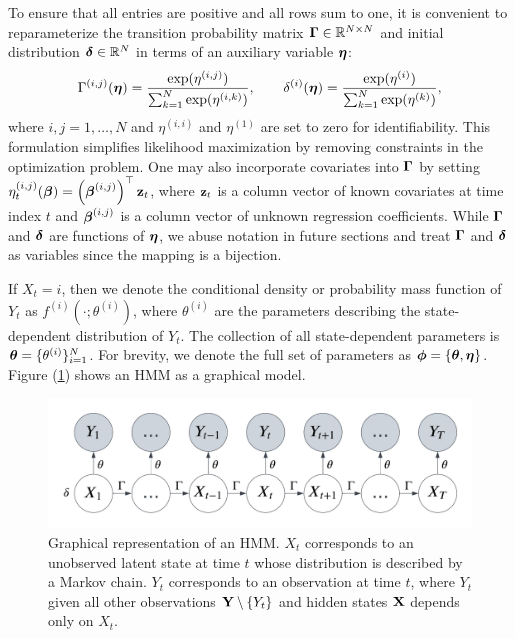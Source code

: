 To ensure that all entries are positive and all rows sum to one, it is convenient to reparameterize the transition probability matrix $\boldsymbol{\Gamma} \in \mathbb{R}^{N \times N}$ and initial distribution $\boldsymbol{\delta} \in \mathbb{R}^N$ in terms of an auxiliary variable $\boldsymbol{\eta}$: %
%
\begin{equation}
    \Gamma^{(i,j)}(\boldsymbol{\eta}) = \frac{\exp(\eta^{(i,j)})}{\sum_{k=1}^N \exp(\eta^{(i,k)})}, \qquad \delta^{(i)}(\boldsymbol{\eta}) = \frac{\exp(\eta^{(i)})}{\sum_{k=1}^N \exp(\eta^{(k)})},
    \label{eqn:reparam}
\end{equation}
%
where $i,j = 1,\ldots,N$ and $\eta^{(i,i)}$ and $\eta^{(1)}$ are set to zero for identifiability. This formulation simplifies likelihood maximization by removing constraints in the optimization problem. One may also incorporate covariates into $\boldsymbol{\Gamma}$ by setting $\eta_t^{(i,j)}(\boldsymbol{\beta}) = \left(\boldsymbol{\beta}^{(i,j)}\right)^{\top} \mathbf{z}_t$, where $\mathbf{z}_t$ is a column vector of known covariates at time index $t$ and $\boldsymbol{\beta}^{(i,j)}$ is a column vector of unknown regression coefficients. While $\boldsymbol{\Gamma}$ and $\boldsymbol{\delta}$ are functions of $\boldsymbol{\eta}$, we abuse notation in future sections and treat $\boldsymbol{\Gamma}$ and $\boldsymbol{\delta}$ as variables since the mapping is a bijection.

If $X_t=i$, then we denote the conditional density or probability mass function of $Y_t$ as $f^{(i)}(\cdot ; \theta^{(i)})$, where $\theta^{(i)}$ are the parameters describing the state-dependent distribution of $Y_t$. The collection of all state-dependent parameters is $\boldsymbol{\theta} = \{\theta^{(i)}\}_{i=1}^N$. For brevity, we denote the full set of parameters as $\boldsymbol{\phi} = \{\boldsymbol{\theta},\boldsymbol{\eta}\}$. Figure (\ref{fig:HMM}) shows an HMM as a graphical model.

\begin{figure}%
    \centering
    \includegraphics[width=5in]{../plt/HMM.png}
    \caption{Graphical representation of an HMM. $X_t$ corresponds to an unobserved latent state at time $t$ whose distribution is described by a Markov chain. $Y_t$ corresponds to an observation at time $t$, where $Y_t$ given all other observations $\mathbf{Y} \setminus \{Y_t\}$ and hidden states $\mathbf{X}$ depends only on $X_t$.}
    \label{fig:HMM}
\end{figure}
%

